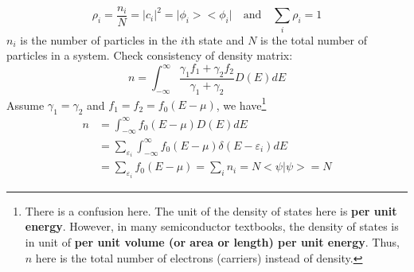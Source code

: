 \begin{equation}
    \rho_{i} = \frac{n_{i}}{N} = \big|c_{i}\big|^{2} = \big|\phi_{i}\big>\big<\phi_{i}\big| \quad \text{and} \quad \sum_{i}{\rho_{i}} = 1
\end{equation} $n_{i}$ is the number of particles in the $i$th state and $N$ is the total number of particles in a system. Check consistency of density matrix: \begin{equation}
    n = \int_{-\infty}^{\infty}\frac{\gamma_{1}f_{1}+\gamma_{2}f_{2}}{\gamma_{1}+\gamma_{2}}D\left(E\right)dE
\end{equation} Assume $\gamma_{1} = \gamma_{2}$ and $f_{1} = f_{2} = f_{0}\left(E-\mu\right)$, we have\footnote{There is a confusion here. The unit of the density of states here is {\bf per unit energy}. However, in many semiconductor textbooks, the density of states is in unit of {\bf per unit volume (or area or length) per unit energy}. Thus, $n$ here is the total number of electrons (carriers) instead of density.} \begin{align}
    n& = \int_{-\infty}^{\infty}f_{0}\left(E-\mu\right)D\left(E\right)dE\nonumber\\
    & = \sum_{\varepsilon_{i}}{\int_{-\infty}^{\infty}f_{0}\left(E-\mu\right)\delta\left(E-\varepsilon_{i}\right)dE}\nonumber\\
    & = \sum_{\varepsilon_{i}}{f_{0}\left(E-\mu\right)} = \sum_{i}{n_{i}} = N\big<\psi\big|\psi\big> = N
\end{align}
